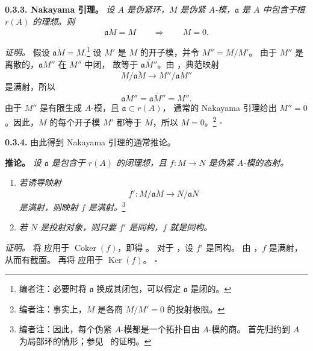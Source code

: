 \medskip
\noindent\textbf{0.3.3. Nakayama 引理。}
\label{sga3:VIIB:0.3.3}
\textit{设 \(A\) 是伪紧环，\(M\) 是伪紧 \(A\)-模，\(\mathfrak a\) 是 \(A\)
中包含于根 \(r(A)\) 的理想。则}
\[
  \overline{\mathfrak aM}=M
  \qquad\Longrightarrow\qquad
  M=0.
\]

\noindent\textit{证明。}
假设
\(\overline{\mathfrak aM}=M\).\footnote{编者注：必要时将 \(\mathfrak a\) 换成其闭包，可以假定 \(\mathfrak a\) 是闭的。}
设 \(M'\) 是 \(M\) 的开子模，并令 \(M''=M/M'\)。
由于 \(M''\) 是离散的，\(\mathfrak aM''\) 在 \(M''\) 中闭，
故等于 \(\overline{\mathfrak aM''}\)。由 ，典范映射
\[
  M/\overline{\mathfrak aM}
  \longrightarrow
  M''/\overline{\mathfrak aM''}
\]
是满射，所以
\[
  \mathfrak aM''
  =
  \overline{\mathfrak aM''}
  =
  M''.
\]
由于 \(M''\) 是有限生成 \(A\)-模，且 \(\mathfrak a\subset r(A)\)，
通常的 Nakayama 引理给出 \(M''=0\)。因此，\(M\) 的每个开子模
\(M'\) 都等于 \(M\)，所以 \(M=0\)。\footnote{编者注：事实上，\(M\) 是各商 \(M/M'=0\) 的投射极限。}
\hfill\(\square\)

\medskip
\noindent\textbf{0.3.4.}
\label{sga3:VIIB:0.3.4}
由此得到 Nakayama 引理的通常推论。

\medskip
\noindent\textbf{推论。}
\label{sga3:VIIB:0.3.4.cor}
\textit{设 \(\mathfrak a\) 是包含于 \(r(A)\) 的闭理想，且
\(f:M\to N\) 是伪紧 \(A\)-模的态射。}
\begin{enumerate}
  \item[\textup{(i)}]
  \textit{若诱导映射}
  \[
    f':
    M/\overline{\mathfrak aM}
    \longrightarrow
    N/\overline{\mathfrak aN}
  \]
  \textit{是满射，则映射 \(f\) 是满射。}\footnote{编者注：因此，每个伪紧 \(A\)-模都是一个拓扑自由 \(A\)-模的商。
  首先归约到 \(A\) 为局部环的情形；参见\  的证明。}

  \item[\textup{(ii)}]
  \textit{若 \(N\) 是投射对象，则只要 \(f'\) 是同构，\(f\) 就是同构。}
\end{enumerate}

\noindent\textit{证明。}
将 应用于
\(\operatorname{Coker}(f)\)，即得 \textup{}。
对于 \textup{}，设 \(f'\) 是同构。
由 \textup{}，\(f\) 是满射，从而有截面。
再将 应用于 \(\operatorname{Ker}(f)\)。
\hfill\(\square\)\par\smallskip

